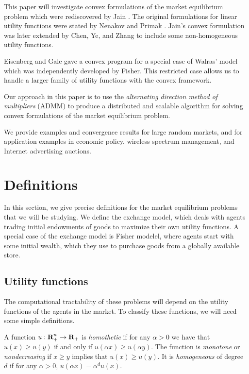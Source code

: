 \documentclass[12pt]{article}
\begin{document}
This paper will investigate convex formulations of the market
equilibrium problem which were rediscovered by Jain \cite{jain2007polynomial}.
The original formulations for linear utility functions
were stated by Nenakov and Primak \cite{nenakov1983algorithm}.
Jain's convex formulation was later extended by Chen, Ye, and Zhang \cite{chen2007note, chen2010equilibrium} to include some non-homogeneous
utility functions.

Eisenberg and Gale \cite{eisenberg1959consensus, gale1960theory, eisenberg1961aggregation} gave a convex program for a special case of Walras' model which was independently developed by Fisher. %
This restricted case allows us to handle a larger family of utility functions
with the convex framework.

Our approach in this paper is to use the \emph{alternating direction method of multipliers} (ADMM) \cite{boyd2011distributed} to produce a distributed and scalable algorithm for solving convex formulations of the market equilibrium problem.

We provide examples and convergence results for large random markets, and 
for application examples in economic policy, wireless spectrum management,
and Internet advertising auctions.

\section{Definitions}
In this section, we give precise definitions for the market equilibrium problems that we will be studying. We define the exchange model,
which deals with agents trading initial endowments of goods to maximize their own utility functions.
A special case of the exchange model is Fisher modelel, where agents
start with some initial wealth, which they use to purchase goods 
from a globally available store.

\subsection{Utility functions}
The computational tractability of these problems will depend on the
utility functions of the agents in the market.
To classify these functions, we will need some simple definitions.

A function $u: {\mbox{\bf R}}^n_+ \to {\mbox{\bf R}}_+$ is \emph{homothetic} if for any $\alpha > 0$ we have that $u(x) \geq u(y)$ if and only if
$u(\alpha x) \geq u(\alpha y)$.
The function is \emph{monotone} or \emph{nondecreasing} if $x \geq y$ implies that $u(x) \geq u(y)$.
It is \emph{homogeneous} of degree $d$ if for any $\alpha > 0$,
$u(\alpha x) = \alpha^d u(x)$.
\end{document}
